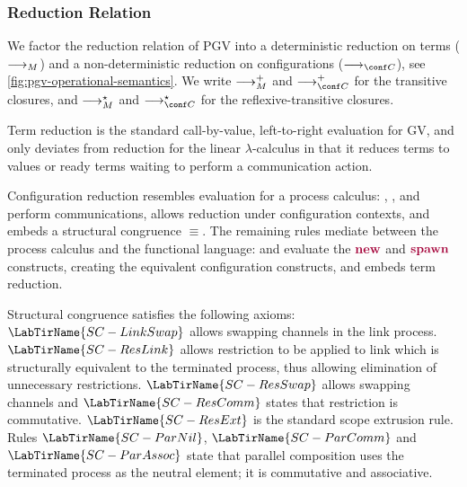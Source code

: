 \subsubsection*{Reduction Relation}


We factor the reduction relation of PGV into a deterministic reduction on terms ($\longrightarrow_{M}$) and a non-deterministic reduction on configurations ($\cred$), see \cref{fig:pgv-operational-semantics}. We write $\longrightarrow_{M}^+$ and $\cred^+$ for the transitive closures, and $\longrightarrow_{M}^\star$ and $\cred^\star$ for the reflexive-transitive closures.

Term reduction is the standard call-by-value, left-to-right evaluation for GV, and only deviates from reduction for the linear $\lambda$-calculus in that it reduces terms to values {or} ready terms waiting to perform a communication action.

Configuration reduction resembles evaluation for a process calculus: , , and  perform communications,  allows reduction under configuration contexts, and  embeds a structural congruence $\equiv$. The remaining rules mediate between the process calculus and the functional language:  and  evaluate the $\tm{\new}$ and $\tm{\spawn}$ constructs, creating the equivalent configuration constructs, and  embeds term reduction.

Structural congruence satisfies the following axioms: $\LabTirName{SC-LinkSwap}$ allows swapping channels in the link process. $\LabTirName{SC-ResLink}$ allows restriction to be applied to link which is structurally equivalent to the terminated process, thus allowing elimination of unnecessary restrictions. $\LabTirName{SC-ResSwap}$ allows swapping channels and $\LabTirName{SC-ResComm}$ states that restriction is commutative. $\LabTirName{SC-ResExt}$ is the standard scope extrusion rule. Rules $\LabTirName{SC-ParNil}$, $\LabTirName{SC-ParComm}$ and $\LabTirName{SC-ParAssoc}$ state that parallel composition uses the terminated process as the neutral element; it is commutative and associative.

